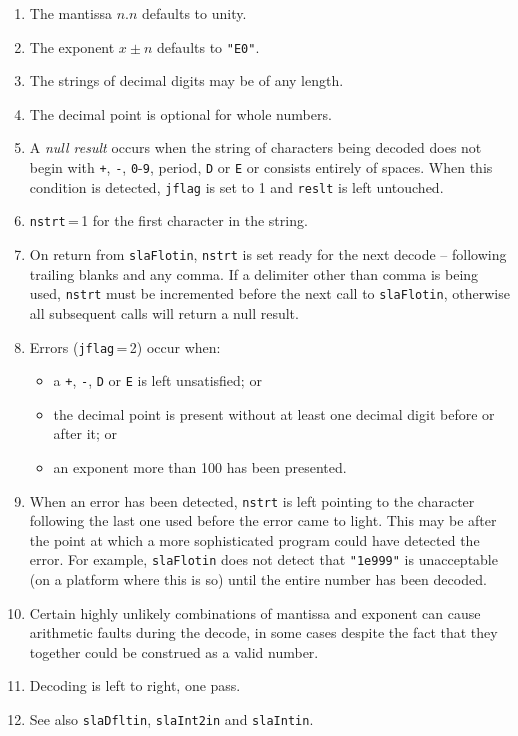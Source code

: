 \documentclass[11pt,fleqn,twoside]{article}
\renewcommand{\_}{{\tt\char'137}}     %
\newcommand{\cstring}[1]{\mbox{{\tt "#1"}}}
\begin{document}
{\begin{enumerate}
 \item The mantissa $n.n$ defaults to unity.
 \item The exponent $x\!\pm\!n$ defaults to \cstring{E0}.
 \item The strings of decimal digits may be of any length.
 \item The decimal point is optional for whole numbers.
 \item A {\it null result}\/ occurs when the string of characters
       being decoded does not begin with
             {\tt +},
             {\tt -},
             {\tt 0}-{\tt 9},
             period,
             {\tt D} or
             {\tt E}
       or consists entirely of spaces.  When this condition is
       detected, {\tt jflag} is set to 1 and
       {\tt reslt} is left untouched.
 \item {\tt nstrt}\,=\,1 for the first character in the string.
 \item On return from {\tt slaFlotin}, {\tt nstrt} is set ready for the next
       decode -- following trailing blanks and any comma.  If a
       delimiter other than comma is being used, {\tt nstrt} must be
       incremented before the next call to {\tt slaFlotin}, otherwise
       all subsequent calls will return a null result.
 \item Errors ({\tt jflag}\,=\,2) occur when:
       \begin{itemize}
       \item a
             {\tt +},
             {\tt -},
             {\tt D} or
             {\tt E}
       is left unsatisfied; or
       \item the decimal point is present without at least
             one decimal digit before or after it; or
       \item an exponent more than 100 has been presented.
       \end{itemize}
 \item When an error has been detected, {\tt nstrt} is left
       pointing to the character following the last
       one used before the error came to light.  This
       may be after the point at which a more sophisticated
       program could have detected the error.  For example,
       {\tt slaFlotin} does not detect that \cstring{1e999} is unacceptable
       (on a platform where this is so) until the entire number
       has been decoded.
 \item Certain highly unlikely combinations of mantissa and
       exponent can cause arithmetic faults during the
       decode, in some cases despite the fact that they
       together could be construed as a valid number.
 \item Decoding is left to right, one pass.
 \item See also {\tt slaDfltin}, {\tt slaInt2in} and {\tt slaIntin}.
 \end{enumerate}
}
\end{document}
